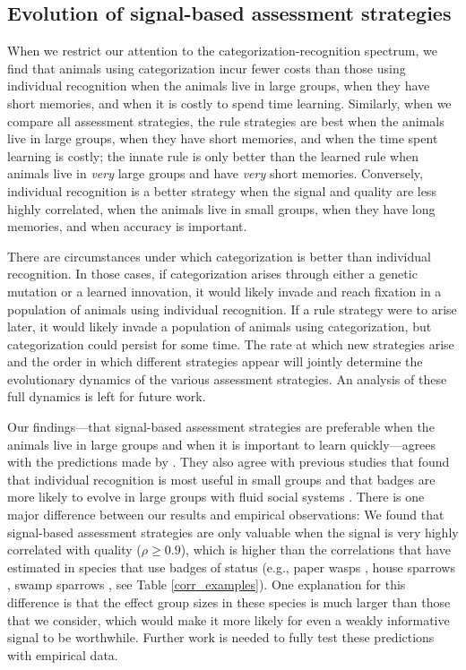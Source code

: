 \subsection*{Evolution of signal-based assessment strategies }

When we restrict our attention to the categorization-recognition spectrum, we find that animals using categorization incur fewer costs than those using individual recognition when the animals live in large groups, when they have short memories, and when it is costly to spend time learning. Similarly, when we compare all assessment strategies, the rule strategies are best when the animals live in large groups, when they have short memories, and when the time spent learning is costly; the innate rule is only better than the learned rule when animals live in \emph{very} large groups and have \emph{very} short memories. Conversely, individual recognition is a better strategy when the signal and quality are less highly correlated, when the animals live in small groups, when they have long memories, and when accuracy is important. 

There are circumstances under which categorization is better than individual recognition. In those cases, if categorization arises through either a genetic mutation or a learned innovation, it would likely invade and reach fixation in a population of animals using individual recognition. If a rule strategy were to arise later, it would likely invade a population of animals using categorization, but categorization could persist for some time. The rate at which new strategies arise and the order in which different strategies appear will jointly determine the evolutionary dynamics of the various assessment strategies. An analysis of these full dynamics is left for future work. 

Our findings---that signal-based assessment strategies are preferable when the animals live in large groups and when it is important to learn quickly---agrees with the predictions made by \citet{sheehan2016evotradeoff}. They also agree with previous studies that found that individual recognition is most useful in small groups \citep{Veiga:1993fk} and that badges are more likely to evolve in large groups with fluid social systems \citep{Rohwer:1975fk,Tibbetts:2009kx}. There is one major difference between our results and empirical observations: We found that signal-based assessment strategies are only valuable when the signal is very highly correlated with quality ($\rho\geq 0.9$), which is higher than the correlations that have estimated in species that use badges of status (e.g., paper wasps \citep{Tibbetts:2004kx}, house sparrows \citep{Veiga:1993fk}, swamp sparrows \citep{Olsen:2010uq}, see Table \ref{corr_examples}). One explanation for this difference is that the effect group sizes in these species is much larger than those that we consider, which would make it more likely for even a weakly informative signal to be worthwhile. Further work is needed to fully test these predictions with empirical data.


